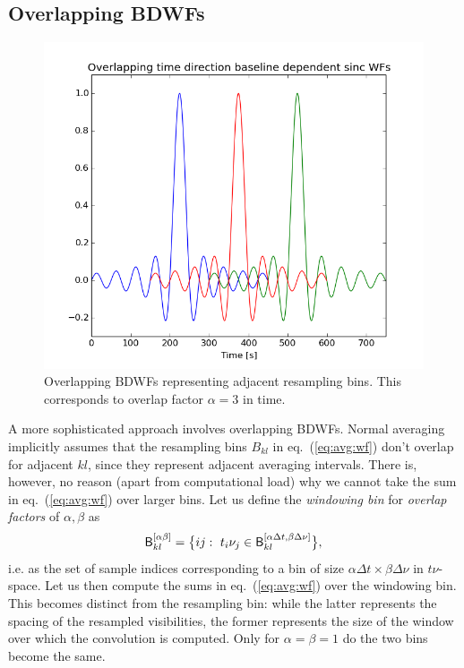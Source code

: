 \documentclass[useAMS,usenatbib]{mn2e}
\begin{document}
\subsection{Overlapping BDWFs}
\label{baseline2}
\newcommand{\WF}[3]{{#1}-$#2${}$\times${}$#3$}
\begin{figure} 
\includegraphics[width=\columnwidth]{./Figures/corrSigVLAMxBl_overlapGdelta.png}\caption{Overlapping 
BDWFs representing adjacent resampling bins. This corresponds to overlap factor $\alpha=3$ in time.}\label{fig:overlap}
\end{figure}

A more sophisticated approach involves overlapping BDWFs. Normal averaging implicitly assumes that the resampling bins $B_{kl}$ 
in eq.~(\ref{eq:avg:wf}) don't overlap for adjacent $kl$, since they represent adjacent averaging intervals.
There is, however, no reason (apart from computational load) why we cannot take the sum in eq.~(\ref{eq:avg:wf}) 
over larger bins. Let us define the \emph{windowing bin} for \emph{overlap factors} of $\alpha,\beta$ as
\begin{equation}
\mathsf{B}^{[\alpha\beta]}_{kl} = \big \{ ij:~t_i\nu_j \in \mathsf{B}^{[\alpha\Delta t,\beta\Delta\nu]}_{kl} \big \},
\end{equation}
i.e. as the set of sample indices corresponding to a bin of size $\alpha\Delta t\times\beta\Delta \nu$ in $t\nu$-space.
Let us then compute the sums in eq.~(\ref{eq:avg:wf}) over the windowing bin. This becomes distinct from the
resampling bin: while the latter represents the spacing of the resampled visibilities, the former represents the size 
of the window over which the convolution is computed. Only for $\alpha=\beta=1$ do the two bins become the same.
\end{document}
